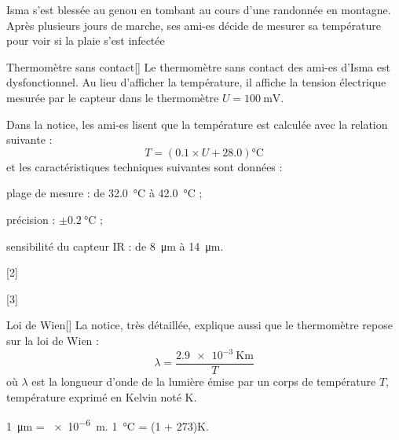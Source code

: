 
Isma s'est blessée au genou en tombant au cours d'une randonnée en montagne.
Après plusieurs jours de marche, ses ami-es décide de mesurer sa température pour voir si la plaie s'est infectée


\begin{doc}{Thermomètre sans contact}[\label{doc:E2_thermo_contact}]
  Le thermomètre sans contact des ami-es d'Isma est dysfonctionnel.
  Au lieu d'afficher la température, il affiche la tension électrique mesurée par le capteur dans le thermomètre $U = \qty{100}{\milli\volt}$.
  
  Dans la notice, les ami-es lisent que la température est calculée avec la relation suivante : 
  \begin{equation*}
    T = (\num{0,1}\times U + \num{28,0}) \unit{\degreeCelsius}
  \end{equation*}
  et les caractéristiques techniques suivantes sont données :
    \begin{listePoints}
      \item plage de mesure : de \qty{32,0}{\degreeCelsius} à \qty{42,0}{\degreeCelsius} ;
      \item précision : $\pm \qty{0,2}{\degreeCelsius}$ ;
      \item sensibilité du capteur IR : de \qty{8}{\micro\m} à \qty{14}{\micro\m}.
    \end{listePoints}
\end{doc}

[2]

[3]


\begin{doc}{Loi de Wien}[\label{doc:E2_loi_wien}]
  La notice, très détaillée, explique aussi que le thermomètre repose sur la loi de Wien :
  \begin{equation*}
    \lambda = \dfrac{\qty{2,9e-3}{\kelvin\m}}{T}
  \end{equation*}
  où $\lambda$ est la longueur d'onde de la lumière émise par un corps de température $T$, température exprimé en Kelvin noté \unit{\kelvin}.

  \qty{1}{\micro\m} = \qty{e-6}{\m}. 
  \qq{}
  \qty{1}{\degreeCelsius} = (1 + 273)\unit{\kelvin}.
\end{doc}

